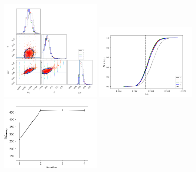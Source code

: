 \documentclass[twocolumn,prd,nofootinbib]{revtex4}
\begin{document}
\begin{figure}
\includegraphics[width=0.45\textwidth]{figures/bns_withspin_corner_mc_delta_xi.png}
\includegraphics[width=0.45\textwidth]{figures/bns_withspin_mc_cum.png}
\includegraphics[width=0.45\textwidth]{figures/bns_withspin_lnL_meanVar.png}

\end{figure}
\end{document}
